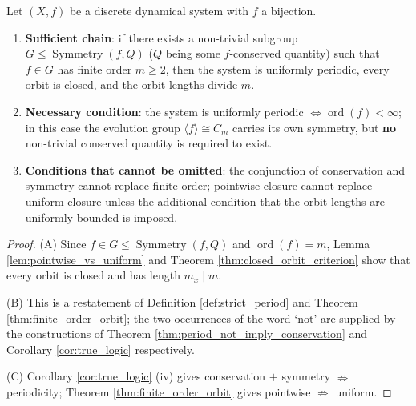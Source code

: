 \begin{theorem}\label{thm:combined_criterion}
Let $(X,f)$ be a discrete dynamical system with $f$ a bijection.
\begin{enumerate}[label=(\Alph*)]
    \item \textbf{Sufficient chain}: if there exists a non-trivial subgroup $G\le\operatorname{Symmetry}(f,Q)$ ($Q$ being some $f$-conserved quantity) such that $f\in G$ has finite order $m\ge 2$, then the system is uniformly periodic, every orbit is closed, and the orbit lengths divide $m$.
    \item \textbf{Necessary condition}: the system is uniformly periodic $\iff \operatorname{ord}(f)<\infty$; in this case the evolution group $\langle f\rangle\cong C_m$ carries its own symmetry, but \textbf{no} non-trivial conserved quantity is required to exist.
    \item \textbf{Conditions that cannot be omitted}: the conjunction of conservation and symmetry cannot replace finite order; pointwise closure cannot replace uniform closure unless the additional condition that the orbit lengths are uniformly bounded is imposed.
\end{enumerate}
\end{theorem}

\begin{proof}
(A) Since $f\in G\le\operatorname{Symmetry}(f,Q)$ and $\operatorname{ord}(f)=m$, Lemma \ref{lem:pointwise_vs_uniform} and Theorem \ref{thm:closed_orbit_criterion} show that every orbit is closed and has length $m_x\mid m$.

(B) This is a restatement of Definition \ref{def:strict_period} and Theorem \ref{thm:finite_order_orbit}; the two occurrences of the word `not' are supplied by the constructions of Theorem \ref{thm:period_not_imply_conservation} and Corollary \ref{cor:true_logic} respectively.

(C) Corollary \ref{cor:true_logic} (iv) gives conservation $+$ symmetry $\nRightarrow$ periodicity; Theorem \ref{thm:finite_order_orbit} gives pointwise $\nRightarrow$ uniform.
\end{proof}

